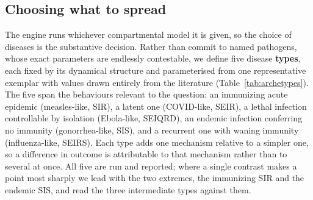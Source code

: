 \subsection{Choosing what to spread} \label{sec:spread}
The engine runs whichever compartmental model it is given, so the choice of diseases is the
substantive decision. Rather than commit to named pathogens, whose exact parameters are endlessly
contestable, we define five disease \textbf{types}, each fixed by its dynamical structure and
parameterised from one representative exemplar with values drawn entirely from the literature
(Table~\ref{tab:archetypes}). The five span the behaviours relevant to the question: an immunizing
acute epidemic (measles-like, SIR), a latent one (COVID-like, SEIR), a lethal infection controllable
by isolation (Ebola-like, SEIQRD), an endemic infection conferring no immunity (gonorrhea-like,
SIS), and a recurrent one with waning immunity (influenza-like, SEIRS). Each type adds one mechanism
relative to a simpler one, so a difference in outcome is attributable to that mechanism rather than
to several at once. All five are run and reported; where a single contrast makes a point most
sharply we lead with the two extremes, the immunizing SIR and the endemic SIS, and read the three
intermediate types against them.




